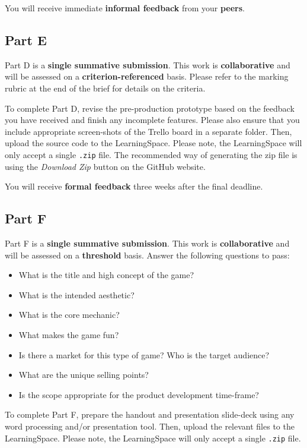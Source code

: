 \documentclass{../fal_assignment}
\begin{document}
You will receive immediate \textbf{informal feedback} from your \textbf{peers}.

\subsection*{Part E}

Part D is a \textbf{single summative submission}. This work is \textbf{collaborative} and will be assessed on a \textbf{criterion-referenced} basis. Please refer to the marking rubric at the end of the brief for details on the criteria.

To complete Part D, revise the pre-production prototype based on the feedback you have received and finish any incomplete features. Please also ensure that you include appropriate screen-shots of the Trello board in a separate folder. Then, upload the source code to the LearningSpace. Please note, the LearningSpace will only accept a single \texttt{.zip} file. The recommended way of generating the zip file is using the \textit{Download Zip} button on the GitHub website.

You will receive \textbf{formal feedback} three weeks after the final deadline.

\subsection*{Part F}

Part F is a \textbf{single summative submission}. This work is \textbf{collaborative} and will be assessed on a \textbf{threshold} basis. Answer the following questions to pass:

\begin{itemize}
	\item What is the title and high concept of the game?
	\item What is the intended aesthetic?
	\item What is the core mechanic? 
	\item What makes the game fun?
	\item Is there a market for this type of game? Who is the target audience?
	\item What are the unique selling points?
	\item Is the scope appropriate for the product development time-frame?
\end{itemize}

To complete Part F, prepare the handout and presentation slide-deck using any word processing and/or presentation tool. Then, upload the relevant files to the LearningSpace. Please note, the LearningSpace will only accept a single \texttt{.zip} file.
\end{document}
